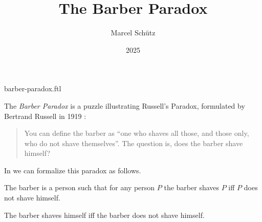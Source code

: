 \documentclass{stex}
\title{The Barber Paradox}
\author{Marcel Schütz}
\date{2025}
\begin{document}
\begin{smodule}{barber-paradox.ftl}


\maketitle

\noindent The \emph{Barber Paradox} is a puzzle illustrating Russell's
Paradox, formulated by Bertrand Russell in 1919 \cite[p. 355]{Russell1919}:

\begin{quotation}
  \noindent You can define the barber as ``one who shaves all those, and 
  those only, who do not shave themselves''.
  The question is, does the barber shave himself?
\end{quotation}

\noindent In \Naproche we can formalize this paradox as follows.

\begin{forthel}
  \begin{signature*}
    The barber is a person such that for any person $P$ the barber shaves $P$ iff $P$ does not shave himself.
  \end{signature*}
  
  \begin{theorem*}[title=Barber Paradox]
    The barber shaves himself iff the barber does not shave himself.
  \end{theorem*}
\end{forthel}

\printbibliography
{}

\end{smodule}
\end{document}
